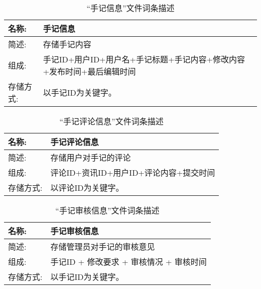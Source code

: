 \begin{table}[H]  
\caption{“手记信息”文件词条描述}  
\begin{center}  
    \begin{tabular}{l p{10cm}} 
        \hline
        \quad 名称:  &   手记信息 \\
        \hline
        \quad 简述:  & 存储手记内容\\
        \hline
        \quad 组成:  & 手记ID+用户ID+用户名+手记标题+手记内容+修改内容+发布时间+最后编辑时间 \\
        \hline
        \quad 存储方式:  & 以手记ID为关键字。 \\
        \hline
    \end{tabular}
    \label{tab1}
\end{center}
\end{table}

\begin{table}[H]  
\caption{“手记评论信息”文件词条描述}  
\begin{center}  
    \begin{tabular}{l p{10cm}} 
        \hline
        \quad 名称:  &  手记评论信息 \\
        \hline
        \quad 简述:  & 存储用户对手记的评论 \\
        \hline
        \quad 组成:  & 评论ID+资讯ID+用户ID+评论内容+提交时间 \\
        \hline
        \quad 存储方式:  & 以评论ID为关键字。 \\
        \hline
    \end{tabular}
    \label{tab1}
\end{center}
\end{table}

\begin{table}[H]  
\caption{“手记审核信息”文件词条描述}  
\begin{center}  
    \begin{tabular}{l p{10cm}} 
        \hline
        \quad 名称:  &  手记审核信息 \\
        \hline
        \quad 简述:  & 存储管理员对手记的审核意见 \\
        \hline
        \quad 组成:  & 手记ID + 修改要求 + 审核情况 + 审核时间 \\
        \hline
        \quad 存储方式:  & 以手记ID为关键字。 \\
        \hline
    \end{tabular}
    \label{tab1}
\end{center}
\end{table}